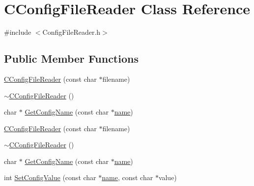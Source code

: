 \hypertarget{class_c_config_file_reader}{}\section{C\+Config\+File\+Reader Class Reference}
\label{class_c_config_file_reader}


{\ttfamily \#include $<$Config\+File\+Reader.\+h$>$}

\subsection*{Public Member Functions}
\begin{DoxyCompactItemize}
\item 
\hyperlink{class_c_config_file_reader_af7dfba388997ac70863ef5110d097247}{C\+Config\+File\+Reader} (const char $\ast$filename)
\item 
\hyperlink{class_c_config_file_reader_a0e685ca3d54be982bd23fb6d8c1151ca}{$\sim$\+C\+Config\+File\+Reader} ()
\item 
char $\ast$ \hyperlink{class_c_config_file_reader_a6ff268e30ab9875fec76e3fccaa5b2f7}{Get\+Config\+Name} (const char $\ast$\hyperlink{http__parser_8c_a8f8f80d37794cde9472343e4487ba3eb}{name})
\item 
\hyperlink{class_c_config_file_reader_af7dfba388997ac70863ef5110d097247}{C\+Config\+File\+Reader} (const char $\ast$filename)
\item 
\hyperlink{class_c_config_file_reader_a0e685ca3d54be982bd23fb6d8c1151ca}{$\sim$\+C\+Config\+File\+Reader} ()
\item 
char $\ast$ \hyperlink{class_c_config_file_reader_a612dfb3253981f5dec7492eac57bb3b5}{Get\+Config\+Name} (const char $\ast$\hyperlink{http__parser_8c_a8f8f80d37794cde9472343e4487ba3eb}{name})
\item 
int \hyperlink{class_c_config_file_reader_a13f96f4261792c3ca3b0f7fd49b203de}{Set\+Config\+Value} (const char $\ast$\hyperlink{http__parser_8c_a8f8f80d37794cde9472343e4487ba3eb}{name}, const char $\ast$value)
\end{DoxyCompactItemize}
